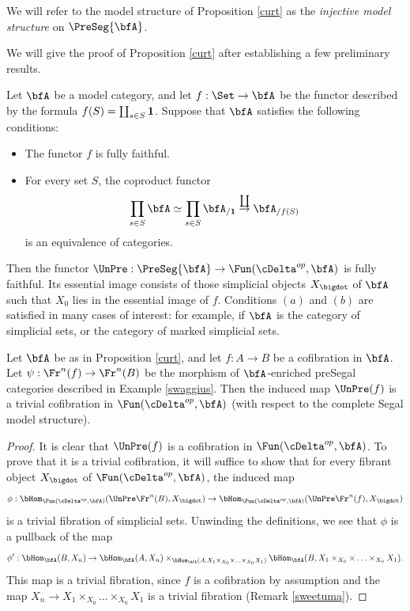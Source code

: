 \begin{remark}
We will refer to the model structure of Proposition \ref{curt} as the
{\it injective model structure} on $\PreSeg{\bfA}$.
\end{remark}

We will give the proof of Proposition \ref{curt} after establishing a few preliminary results.

\begin{remark}
Let $\bfA$ be a model category, and let $f: \Set \rightarrow \bfA$ be the functor described by the formula
$f(S) = \coprod_{s \in S} {\bf 1}$. Suppose that $\bfA$ satisfies the following conditions:
\begin{itemize}
\item[$(a)$] The functor $f$ is fully faithful.
\item[$(b)$] For every set $S$, the coproduct functor
$$ \prod_{s \in S} \bfA \simeq \prod_{s \in S} \bfA_{/ {\bf 1} }
\stackrel{ \coprod}{\rightarrow} \bfA_{/f(S)}$$
is an equivalence of categories. 
\end{itemize}
Then the functor $\UnPre: \PreSeg{ \bfA} \rightarrow \Fun( \cDelta^{op}, \bfA)$ is fully faithful.
Its essential image consists of those simplicial objects $X_{\bigdot}$ of $\bfA$ such that
$X_0$ lies in the essential image of $f$. Conditions $(a)$ and $(b)$ are satisfied in
many cases of interest: for example, if $\bfA$ is the category of simplicial sets, or the category of marked simplicial sets.
\end{remark}

\begin{lemma}\label{swagg}
Let $\bfA$ be as in Proposition \ref{curt}, and let $f: A \rightarrow B$ be a cofibration in $\bfA$.
Let $\psi: \Fr^{n}(f) \rightarrow \Fr^{n}(B)$ be the morphism of $\bfA$-enriched preSegal categories
described in Example \ref{swaggius}. Then the induced map $\UnPre(f)$ is a trivial cofibration
in $\Fun( \cDelta^{op}, \bfA)$ (with respect to the complete Segal model structure).
\end{lemma}

\begin{proof}
It is clear that $\UnPre(f)$ is a cofibration in $\Fun( \cDelta^{op}, \bfA)$. To prove that it is a trivial cofibration, it will suffice to show that for every fibrant object $X_{\bigdot}$ of
$\Fun( \cDelta^{op}, \bfA)$, the induced map
$$ \phi: \bHom_{\Fun( \cDelta^{op}, \bfA)}(\UnPre \Fr^{n}(B), X_{\bigdot} ) \rightarrow \bHom_{\Fun(\cDelta^{op}, \bfA)}(\UnPre \Fr^{n}(f), X_{\bigdot})$$
is a trivial fibration of simplicial sets. Unwinding the definitions, we see that $\phi$ is a pullback
of the map
$$ \phi': \bHom_{\bfA}(B, X_n) \rightarrow \bHom_{\bfA}(A, X_n)
\times_{ \bHom_{\bfA}(A, X_1 \times_{X_0} \times \ldots \times_{X_0} X_1)}
\bHom_{\bfA}(B, X_1 \times_{X_0} \times \ldots \times_{X_0} X_1).$$
This map is a trivial fibration, since $f$ is a cofibration by assumption and the map
$X_n \rightarrow X_1 \times_{X_0} \ldots \times_{X_0} X_1$ is a trivial fibration
(Remark \ref{sweetuma}).
\end{proof}

